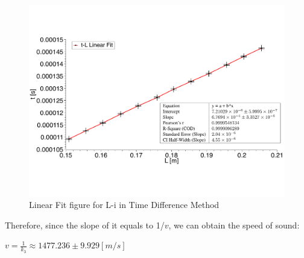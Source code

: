 \documentclass[a4paper,12pt]{article}
\begin{document}
\begin{figure}[h] 
    \centering
    \includegraphics[width=1.04\textwidth]{Fig9_2} 
    \caption{Linear Fit figure for L-i in Time Difference Method} 
\end{figure}

\newpage

Therefore, since the slope of it equals to 1/$v$, we can obtain the speed of sound:

\begin{center}
$\displaystyle v = \frac{1}{k_3} \approx 1477.236 \pm 9.929 [m/s]$
\end{center}
\end{document}
